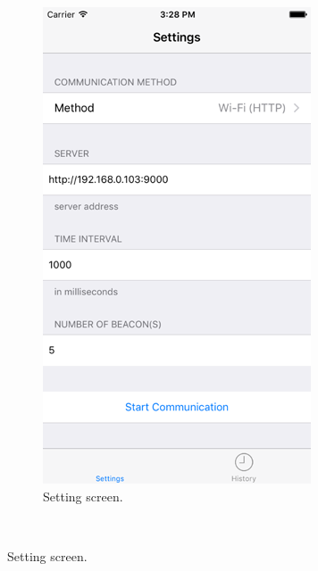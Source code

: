 \documentclass[journal]{vgtc}                %
\begin{document}
\begin{figure}
    \centering
    \begin{subfigure}[b]{0.22\textwidth}
        \includegraphics[width=\textwidth]{setting-screen}
        \caption{Setting screen.}
        \label{fig:setting-screen}
    \end{subfigure}
    ~ %

\end{figure}
\end{document}
